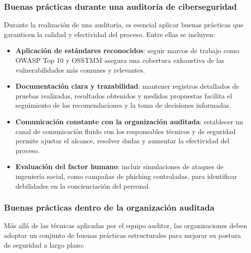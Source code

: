 \documentclass[a4paper, 10pt]{article}
\begin{document}
    \subsubsection{Buenas prácticas durante una auditoría de ciberseguridad}
    
    Durante la realización de una auditoría, es esencial aplicar buenas prácticas que garanticen la calidad y efectividad del proceso. Entre ellas se incluyen:
    
    \begin{itemize}
    \item \textbf{Aplicación de estándares reconocidos}: seguir marcos de trabajo como OWASP Top 10 y OSSTMM asegura una cobertura exhaustiva de las vulnerabilidades más comunes y relevantes.
    
    \item \textbf{Documentación clara y trazabilidad}: mantener registros detallados de pruebas realizadas, resultados obtenidos y medidas propuestas facilita el seguimiento de las recomendaciones y la toma de decisiones informadas.
    
    \item \textbf{Comunicación constante con la organización auditada}: establecer un canal de comunicación fluido con los responsables técnicos y de seguridad permite ajustar el alcance, resolver dudas y aumentar la efectividad del proceso.
    
    \item \textbf{Evaluación del factor humano}: incluir simulaciones de ataques de ingeniería social, como campañas de phishing controladas, para identificar debilidades en la concienciación del personal.
    \end{itemize}
    
    \subsubsection{Buenas prácticas dentro de la organización auditada}
    
    Más allá de las técnicas aplicadas por el equipo auditor, las organizaciones deben adoptar un conjunto de buenas prácticas estructurales para mejorar su postura de seguridad a largo plazo:
    
\end{document}
